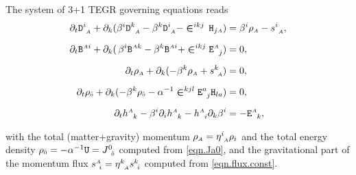 \documentclass[
10pt, %
a4paper, %
oneside, %
twocolumn,
headinclude,footinclude, %
BCOR5mm, %
]{scrartcl}
\newcommand{\sA}{\mathsmaller A}
\newcommand{\pd}[1]{\partial_{#1}}
\newcommand{\tetrsymbol}{h}
\newcommand{\itetrsymbol}{\eta}
\newcommand{\itetr}[2]{\itetrsymbol^{#1}_{\phantom{#1}#2}}
\newcommand{\tetr}[2]{\tetrsymbol^{#1}_{\phantom{#1}#2}}
\newcommand{\stress}[2]{s_{\ #1}^{#2}}
\newcommand{\aD}[2]{\mathcal{D}_{\phantom{#2}#1}^{#2}}	%
\newcommand{\Dfin}[2]{\mathtt{D}_{\phantom{#2}#1}^{#2}}	%
\newcommand{\Hfin}[2]{\mathtt{H}_{#2#1}}	%
\newcommand{\Efin}[2]{\mathtt{E}^{#1}_{\phantom{#1}#2}}	%
\newcommand{\Ufin}{\mathtt{U}}
\newcommand{\aB}[2]{\mathcal{B}^{#1#2}}	%
\newcommand{\Bfin}[2]{\mathtt{B}^{#1#2}}	%
\newcommand{\aU}{\mathcal{U}}%
\newcommand{\LCsymb}{\bm{\in}}    %
\newcommand{\rhs}[1]{f_{#1}}
\newcommand{\KD}[2]{\delta^{#1}_{\ #2}}
\newcommand{\NC}[2]{J^{#2}_{\phantom{#2}#1}}
\newcommand{\indalg}[1]{\hat{\mathsmaller{#1}}}
\newcommand{\shift}[1]{\beta^{#1}}
\begin{document}
	The system of 3+1 TEGR governing equations reads
	\begin{subequations}\label{eqn.3+1.summary}
		\begin{align}%
			\pd{t} \Dfin{\sA}{i} + \pd{k}(\shift{i} 
			\Dfin{\sA}{k} - \shift{k}\Dfin{\sA}{i}  - \LCsymb^{ikj} \,
			\Hfin{\sA}{j}) & 
			= \shift{i} \rho_{\sA} - \stress{\sA}{i},
			\label{eqn.3+1.D}
			\\[2mm]
			\pd{t} \Bfin{\sA}{i} + \pd{k}(\,\shift{i} 
			\Bfin{\sA}{k} - \shift{k}\Bfin{\sA}{i}  + \LCsymb^{ikj} 
			\Efin{\sA}{j}) & 
			= 0,
			\label{eqn.3+1.B}
			\\[2mm]
			\pd{t} \rho_\sA +  \pd{k} (-\shift{k} \rho_\sA + \stress{\sA}{k}) &= 
			0,\label{eqn.3+1.m}\\[2mm]
			\pd{t} \rho_{\indalg{0}} + \pd{k} (-\shift{k} \rho_{\indalg{0}} 
			- \alpha^{-1} 
			\LCsymb^{kjl}\Efin{a}{j}\Hfin{a}{l}) &= 0,\label{eqn.3+1.e}\\[2mm]
			\pd{t} \tetr{\sA}{k} - \beta^i \pd{i} \tetr{\sA}{k} - \tetr{\sA}{i} \pd{k} \beta^i 
			& = 
			-\Efin{\sA}{k},
			\label{eqn.3+1.h}
		\end{align}
	\end{subequations}
	
	with the total (matter+gravity) momentum $ \rho_{\sA} = \itetr{i}{\sA}\rho_i $ and the total 
	energy density $ \rho_{\indalg{0}} = -\alpha^{-1} \Ufin = \NC{\indalg{0}}{0} $ computed from 
	\eqref{eqn.Ja0}, and the gravitational part of the momentum flux $ \stress{i}{\sA} = 
	\itetr{k}{\sA} \stress{i}{k}$  computed from \eqref{eqn.flux.const}.
\end{document}
